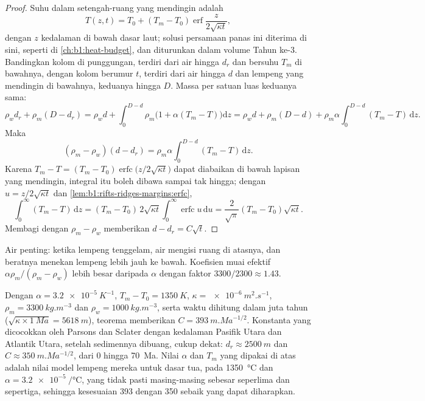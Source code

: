 \begin{proof}
Suhu dalam setengah-ruang yang mendingin adalah
\[
  T(z, t) = T_0 + (T_m - T_0)\operatorname{erf}\frac{z}{2\sqrt{\kappa t}},
\]
dengan $z$ kedalaman di bawah dasar laut; solusi persamaan panas ini diterima di sini, seperti di \cref{ch:b1:heat-budget}, dan diturunkan dalam volume Tahun ke-3. Bandingkan kolom di punggungan, terdiri dari air hingga $d_r$ dan  bersuhu $T_m$ di bawahnya, dengan kolom berumur $t$, terdiri dari air hingga $d$ dan lempeng yang mendingin di bawahnya, keduanya hingga  $D$. Massa per satuan luas keduanya sama:
\[
  \rho_w d_r + \rho_m (D - d_r) = \rho_w d + \int_0^{D-d}\rho_m\bigl(1 + \alpha(T_m - T)\bigr)\mathrm dz
  = \rho_w d + \rho_m (D - d) + \rho_m\alpha\int_0^{D-d}(T_m - T)\,\mathrm dz.
\]
Maka
\[
  (\rho_m - \rho_w)(d - d_r) = \rho_m\alpha\int_0^{D-d}(T_m - T)\,\mathrm dz.
\]
Karena $T_m - T = (T_m - T_0)\operatorname{erfc}\bigl(z/2\sqrt{\kappa t}\bigr)$ dapat diabaikan di bawah lapisan yang mendingin, integral itu boleh dibawa sampai tak hingga; dengan $u = z/2\sqrt{\kappa t}$ dan \cref{lem:b1:rifts-ridges-margins:erfc},
\[
  \int_0^\infty (T_m - T)\,\mathrm dz = (T_m - T_0)\,2\sqrt{\kappa t}\int_0^\infty\operatorname{erfc}u\,\mathrm du
  = \frac{2}{\sqrt\pi}(T_m - T_0)\sqrt{\kappa t}.
\]
Membagi dengan $\rho_m - \rho_w$ memberikan $d - d_r = C\sqrt t$.
\end{proof}

Air penting: ketika lempeng tenggelam, air mengisi ruang di atasnya, dan beratnya menekan lempeng lebih jauh ke bawah. Koefisien muai efektif $\alpha\rho_m/(\rho_m - \rho_w)$ lebih besar daripada $\alpha$ dengan faktor $3300/2300 \approx 1.43$.

Dengan $\alpha = \qty{3.2e-5}{K^{-1}}$, $T_m - T_0 = \qty{1350}{K}$,
$\kappa = \qty{e-6}{m^2.s^{-1}}$, $\rho_m = \qty{3300}{kg.m^{-3}}$ dan
$\rho_w = \qty{1000}{kg.m^{-3}}$, serta waktu dihitung dalam juta tahun
($\sqrt{\kappa\times\qty{1}{Ma}} = \qty{5618}{m}$), teorema memberikan
$C = \qty{393}{m.Ma^{-1/2}}$. Konstanta yang dicocokkan oleh Parsons dan Sclater
dengan kedalaman Pasifik Utara dan Atlantik Utara, setelah sedimennya dibuang,
cukup dekat: $d_r \approx \qty{2500}{m}$ dan
$C \approx \qty{350}{m.Ma^{-1/2}}$, dari 0 hingga \qty{70}{Ma}. Nilai
$\alpha$ dan $T_m$ yang dipakai di atas adalah nilai model lempeng mereka untuk
dasar tua,  pada \qty{1350}{\degreeCelsius} dan
$\alpha = \qty{3.2e-5}{\per\degreeCelsius}$, yang tidak pasti masing-masing
sebesar seperlima dan sepertiga, sehingga kesesuaian 393 dengan 350 sebaik yang
dapat diharapkan.

